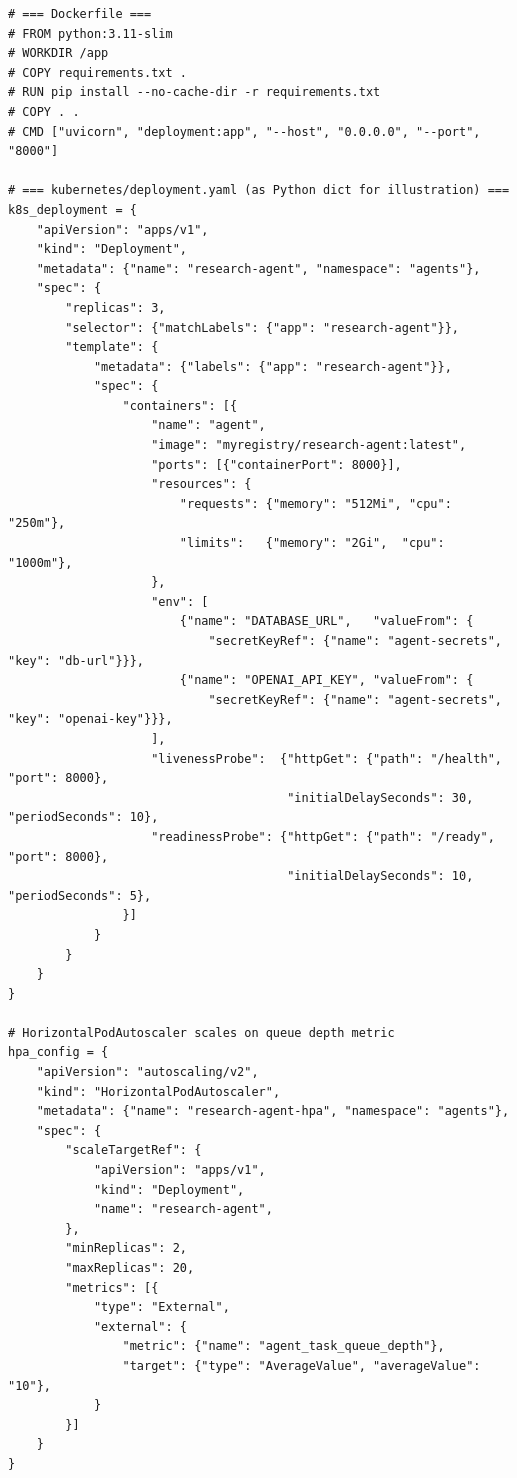 \begin{lstlisting}[style=pythonstyle, caption={Deployment configuration: Docker and Kubernetes}]
# === Dockerfile ===
# FROM python:3.11-slim
# WORKDIR /app
# COPY requirements.txt .
# RUN pip install --no-cache-dir -r requirements.txt
# COPY . .
# CMD ["uvicorn", "deployment:app", "--host", "0.0.0.0", "--port", "8000"]

# === kubernetes/deployment.yaml (as Python dict for illustration) ===
k8s_deployment = {
    "apiVersion": "apps/v1",
    "kind": "Deployment",
    "metadata": {"name": "research-agent", "namespace": "agents"},
    "spec": {
        "replicas": 3,
        "selector": {"matchLabels": {"app": "research-agent"}},
        "template": {
            "metadata": {"labels": {"app": "research-agent"}},
            "spec": {
                "containers": [{
                    "name": "agent",
                    "image": "myregistry/research-agent:latest",
                    "ports": [{"containerPort": 8000}],
                    "resources": {
                        "requests": {"memory": "512Mi", "cpu": "250m"},
                        "limits":   {"memory": "2Gi",  "cpu": "1000m"},
                    },
                    "env": [
                        {"name": "DATABASE_URL",   "valueFrom": {
                            "secretKeyRef": {"name": "agent-secrets", "key": "db-url"}}},
                        {"name": "OPENAI_API_KEY", "valueFrom": {
                            "secretKeyRef": {"name": "agent-secrets", "key": "openai-key"}}},
                    ],
                    "livenessProbe":  {"httpGet": {"path": "/health", "port": 8000},
                                       "initialDelaySeconds": 30, "periodSeconds": 10},
                    "readinessProbe": {"httpGet": {"path": "/ready",  "port": 8000},
                                       "initialDelaySeconds": 10, "periodSeconds": 5},
                }]
            }
        }
    }
}

# HorizontalPodAutoscaler scales on queue depth metric
hpa_config = {
    "apiVersion": "autoscaling/v2",
    "kind": "HorizontalPodAutoscaler",
    "metadata": {"name": "research-agent-hpa", "namespace": "agents"},
    "spec": {
        "scaleTargetRef": {
            "apiVersion": "apps/v1",
            "kind": "Deployment",
            "name": "research-agent",
        },
        "minReplicas": 2,
        "maxReplicas": 20,
        "metrics": [{
            "type": "External",
            "external": {
                "metric": {"name": "agent_task_queue_depth"},
                "target": {"type": "AverageValue", "averageValue": "10"},
            }
        }]
    }
}
\end{lstlisting}

